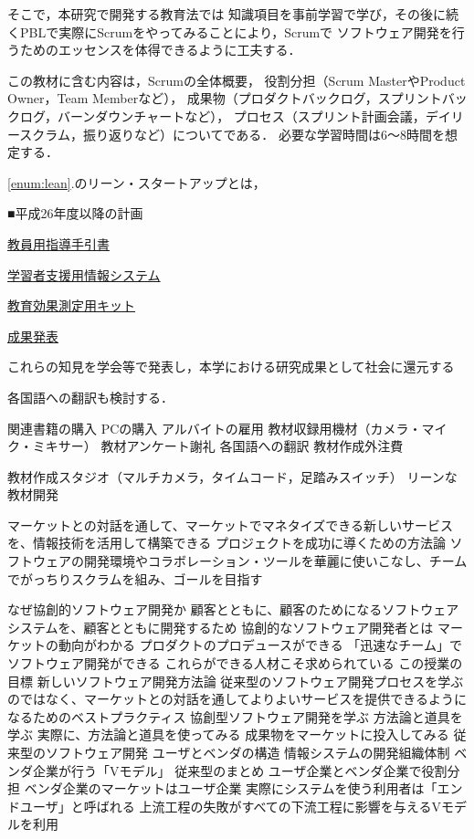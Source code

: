 \documentclass[11pt,a4paper,twoside]{jarticle}
\newcommand{\研究種別}{A}	%
\newcommand{\研究課題名}{コ・クリエイティブなソフトウェア開発者を育成するPBL型教育}
\newcommand{\研究機関名}{産業技術大学院大学}
\newcommand{\研究代表者氏名}{中鉢　欣秀}
\newcommand{\研究代表者氏名ふりがな}{ちゅうばち　よしひで}
\newcommand{\本応募effort}{\KLEffort{18}}	%
\newcommand{\研究期間の最終元号年度}{27}	%
\begin{document}
{	そこで，本研究で開発する教育法では
	知識項目を事前学習で学び，その後に続くPBLで実際にScrumをやってみることにより，Scrumで
	ソフトウェア開発を行うためのエッセンスを体得できるように工夫する．
	
	この教材に含む内容は，Scrumの全体概要，
	役割分担（Scrum MasterやProduct Owner，Team Memberなど），
	成果物（プロダクトバックログ，スプリントバックログ，バーンダウンチャートなど），
	プロセス（スプリント計画会議，デイリースクラム，振り返りなど）についてである．
	必要な学習時間は6～8時間を想定する．
	
	\ref{enum:lean}.のリーン・スタートアップとは，


	\begin{flushleft}
		■平成26年度以降の計画
	\end{flushleft}
	
	\underline{教員用指導手引書}
	
	\underline{学習者支援用情報システム}
	
	\underline{教育効果測定用キット}
	
	\underline{成果発表}
	
	これらの知見を学会等で発表し，本学における研究成果として社会に還元する
	
	各国語への翻訳も検討する．  
	
	関連書籍の購入
	PCの購入
	アルバイトの雇用
	教材収録用機材（カメラ・マイク・ミキサー）
	教材アンケート謝礼
	各国語への翻訳
	教材作成外注費
	
	教材作成スタジオ（マルチカメラ，タイムコード，足踏みスイッチ）
	リーンな教材開発


マーケットとの対話を通して、マーケットでマネタイズできる新しいサービスを、情報技術を活用して構築できる
プロジェクトを成功に導くための方法論
ソフトウェアの開発環境やコラボレーション・ツールを華麗に使いこなし、チームでがっちりスクラムを組み、ゴールを目指す

なぜ協創的ソフトウェア開発か
顧客とともに、顧客のためになるソフトウェアシステムを、顧客とともに開発するため
協創的なソフトウェア開発者とは
マーケットの動向がわかる
プロダクトのプロデュースができる
「迅速なチーム」でソフトウェア開発ができる
これらができる人材こそ求められている
この授業の目標
新しいソフトウェア開発方法論
従来型のソフトウェア開発プロセスを学ぶのではなく、マーケットとの対話を通してよりよいサービスを提供できるようになるためのベストプラクティス
協創型ソフトウェア開発を学ぶ
方法論と道具を学ぶ
実際に、方法論と道具を使ってみる
成果物をマーケットに投入してみる
従来型のソフトウェア開発
ユーザとベンダの構造
情報システムの開発組織体制
ベンダ企業が行う「Vモデル」
従来型のまとめ
ユーザ企業とベンダ企業で役割分担
ベンダ企業のマーケットはユーザ企業
実際にシステムを使う利用者は「エンドユーザ」と呼ばれる
上流工程の失敗がすべての下流工程に影響を与えるVモデルを利用

}
\end{document}
